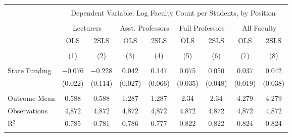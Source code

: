 
\begin{tabular}{@{\extracolsep{5pt}}lcccccccc} 
\\[-1.8ex]\hline 
\hline \\[-1.8ex] 
 & \multicolumn{8}{c}{Dependent Variable: Log Faculty Count per Students, by Position} \\ 
\cline{2-9} 
\\[-1.8ex] & \multicolumn{2}{c}{Lecturers} & \multicolumn{2}{c}{Asst. Professors} & \multicolumn{2}{c}{Full Professors} & \multicolumn{2}{c}{All Faculty} \\ 
 & OLS & 2SLS & OLS & 2SLS & OLS & 2SLS & OLS & 2SLS \\ 
\\[-1.8ex] & (1) & (2) & (3) & (4) & (5) & (6) & (7) & (8)\\ 
\hline \\[-1.8ex] 
 State Funding & $-$0.076 & $-$0.228 & 0.042 & 0.147 & 0.075 & 0.050 & 0.037 & 0.042 \\ 
  & (0.022) & (0.114) & (0.027) & (0.066) & (0.035) & (0.048) & (0.019) & (0.038) \\ 
 \hline \\[-1.8ex] 
Outcome Mean & 0.588 & 0.588 & 1.287 & 1.287 & 2.34 & 2.34 & 4.279 & 4.279 \\ 
Observations & 4,872 & 4,872 & 4,872 & 4,872 & 4,872 & 4,872 & 4,872 & 4,872 \\ 
R$^{2}$ & 0.785 & 0.781 & 0.786 & 0.777 & 0.822 & 0.822 & 0.824 & 0.824 \\ 
\hline 
\hline \\[-1.8ex] 
\end{tabular} 
